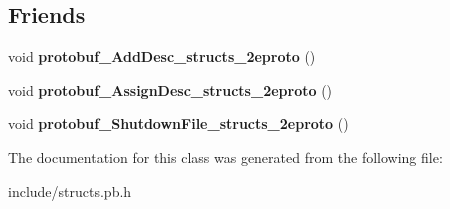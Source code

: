 \subsection*{Friends}
\begin{DoxyCompactItemize}
\item 
\hypertarget{classstruct_definitions_1_1_data_package_abcf9b7cc173b6d79696d01156751b8ce}{}\label{classstruct_definitions_1_1_data_package_abcf9b7cc173b6d79696d01156751b8ce} 
void {\bfseries protobuf\+\_\+\+Add\+Desc\+\_\+structs\+\_\+2eproto} ()
\item 
\hypertarget{classstruct_definitions_1_1_data_package_adb32752ff5178cb902966da6e3cb3bc6}{}\label{classstruct_definitions_1_1_data_package_adb32752ff5178cb902966da6e3cb3bc6} 
void {\bfseries protobuf\+\_\+\+Assign\+Desc\+\_\+structs\+\_\+2eproto} ()
\item 
\hypertarget{classstruct_definitions_1_1_data_package_ac2e4278d7604361fa6502b1cfbf9d980}{}\label{classstruct_definitions_1_1_data_package_ac2e4278d7604361fa6502b1cfbf9d980} 
void {\bfseries protobuf\+\_\+\+Shutdown\+File\+\_\+structs\+\_\+2eproto} ()
\end{DoxyCompactItemize}


The documentation for this class was generated from the following file\+:\begin{DoxyCompactItemize}
\item 
include/structs.\+pb.\+h\end{DoxyCompactItemize}
